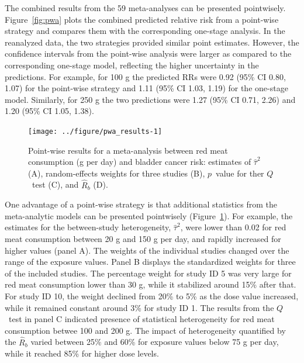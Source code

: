 \documentclass[11pt,a4paper,twoside,openany]{book}\usepackage{knitr}
\begin{document}
{{\begin{knitrout}
\end{knitrout}

\noindent The combined results from the 59 meta-analyses can be presented pointwisely. Figure~\ref{fig:pwa} plots the combined predicted relative risk from a point-wise strategy and compares them with the corresponding one-stage analysis. In the reanalyzed data, the two strategies provided similar point estimates. However, the confidence intervals from the point-wise analysis were larger as compared to the corresponding one-stage model, reflecting the higher uncertainty in the predictions. For example, for 100 g the predicted RRs were 0.92 (95\% CI 0.80, 1.07) for the point-wise strategy and 1.11 (95\% CI 1.03, 1.19) for the one-stage model. Similarly, for 250 g the two predictions were 1.27 (95\% CI 0.71, 2.26) and 1.20 (95\% CI 1.05, 1.38).

\begin{knitrout}\footnotesize
{}\color{fgcolor}\begin{figure}[ht!]

{\centering \texttt{[image: ../figure/pwa\_results-1]} 

}

\caption[Point-wise results for a meta-analysis between red meat consumption (g per day) and bladder cancer risk]{Point-wise results for a meta-analysis between red meat consumption (g per day) and bladder cancer risk: estimates of $\hat \tau^2$ (A), random-effects weights for three studies (B), $p$~value for ther $Q$~test (C), and $\hat R_b$ (D).}\label{fig:pwa_results}
\end{figure}


\end{knitrout}

One advantage of a point-wise strategy is that additional statistics from the meta-analytic models can be presented pointwisely (Figure~\ref{fig:pwa_results}). For example, the estimates for the between-study heterogeneity, $\hat \tau^2$, were lower than 0.02 for red meat consumption between 20 g and 150 g per day, and rapidly increased for higher values (panel A). The weights of the individual studies changed over the range of the exposure values. Panel B displays the standardized weights for three of the included studies. The percentage weight for study ID 5 was very large for red meat consumption lower than 30 g, while it stabilized around 15\% after that. For study ID 10, the weight declined from 20\% to 5\% as the dose value increased, while it remained constant around 3\% for study ID 1. The results from the $Q$~test in panel C indicated presence of statistical heterogeneity for red meat consumption betwee 100 and 200 g. The impact of heterogeneity quantified by the $\hat R_b$ varied between 25\% and 60\% for exposure values below 75 g per day, while it reached 85\% for higher dose levels.





}}
\end{document}
